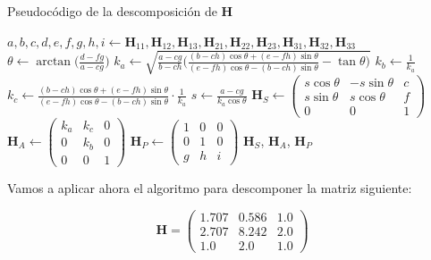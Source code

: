 \documentclass[11pt,a4paper]{article}
\begin{document}
\begin{algorithm}[H]
\caption{Pseudocódigo de la descomposición de $\mathbf{H}$}
\begin{algorithmic}[1]
\State $a,b,c,d,e,f,g,h,i \gets \mathbf{H}_{11}, \mathbf{H}_{12}, \mathbf{H}_{13}, \mathbf{H}_{21}, \mathbf{H}_{22}, \mathbf{H}_{23}, \mathbf{H}_{31}, \mathbf{H}_{32}, \mathbf{H}_{33}$
\State $\theta \gets \arctan\Big( \frac{d-fg}{a-cg} \Big)$
\State $k_a \gets \sqrt{\frac{a-cg}{b-ch}\Big(\frac{(b-ch)\cos\theta + (e-fh)\sin\theta}{(e-fh)\cos\theta - (b-ch)\sin\theta} - \tan\theta\Big)}$
\State $k_b \gets \frac{1}{k_a}$
\State $k_c \gets \frac{(b-ch)\cos\theta + (e-fh)\sin\theta}{(e-fh)\cos\theta - (b-ch)\sin\theta} \cdot \frac{1}{k_a}$
\State $s \gets \frac{a-cg}{k_a\cos\theta}$
\State $\mathbf{H}_S \gets \begin{pmatrix} s\cos\theta & -s\sin\theta & c \\ s\sin\theta & s\cos\theta & f \\
0 & 0 & 1 \end{pmatrix}$
\State $ \mathbf{H}_A \gets \begin{pmatrix}
k_a & k_c & 0 \\ 0 & k_b & 0 \\ 0 & 0 & 1
\end{pmatrix}
$
\State $ \mathbf{H}_P \gets
\begin{pmatrix}
1 & 0 & 0 \\ 0 & 1 & 0 \\ g & h & i
\end{pmatrix}
$
\State \Return $\mathbf{H}_S$, $\mathbf{H}_A$, $\mathbf{H}_P$
\EndFunction
\end{algorithmic}
\end{algorithm}

Vamos a aplicar ahora el algoritmo para descomponer la matriz
siguiente:

$$
	\mathbf{H} = \begin{pmatrix}
	1.707 & 0.586 & 1.0 \\
	2.707 & 8.242 & 2.0 \\
	1.0 & 2.0 & 1.0
	\end{pmatrix}
$$
\end{document}

